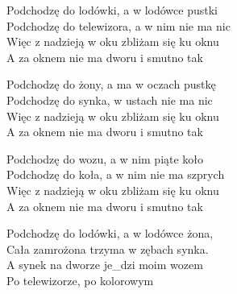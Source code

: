 \begin{text}
    Podchodzę do lodówki, a w lodówce pustki\\
    Podchodzę do telewizora, a w nim nie ma nic\\
    Więc z nadzieją w oku zbliżam się ku oknu\\
    A za oknem nie ma dworu i smutno tak

    Podchodzę do żony, a ma w oczach pustkę\\
    Podchodzę do synka, w ustach nie ma nic\\
    Więc z nadzieją w oku zbliżam się ku oknu\\
    A za oknem nie ma dworu i smutno tak

    Podchodzę do wozu, a w nim piąte koło\\
    Podchodzę do koła, a w nim nie ma szprych\\
    Więc z nadzieją w oku zbliżam się ku oknu\\
    A za oknem nie ma dworu i smutno tak

    Podchodzę do lodówki, a w lodówce żona,\\
    Cała zamrożona trzyma w zębach synka.\\
    A synek na dworze je_dzi moim wozem\\
    Po telewizorze, po kolorowym
\end{text}
\begin{chord}

\end{chord}
